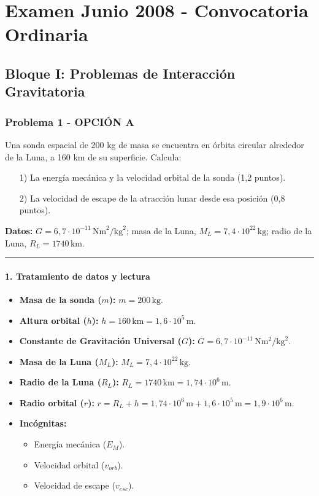 \chapter{Examen Junio 2008 - Convocatoria Ordinaria}
\label{chap:2008_jun_ord}

\section{Bloque I: Problemas de Interacción Gravitatoria}
\label{sec:grav_2008_jun_ord}

\subsection{Problema 1 - OPCIÓN A}
\label{subsec:1A_2008_jun_ord}

\begin{cajaenunciado}
Una sonda espacial de 200 kg de masa se encuentra en órbita circular alrededor de la Luna, a 160 km de su superficie. Calcula:
\begin{enumerate}
    \item[1)] La energía mecánica y la velocidad orbital de la sonda (1,2 puntos).
    \item[2)] La velocidad de escape de la atracción lunar desde esa posición (0,8 puntos).
\end{enumerate}
\textbf{Datos:} $G=6,7\cdot10^{-11}\,\text{Nm}^2/\text{kg}^2$; masa de la Luna, $M_L=7,4\cdot10^{22}\,\text{kg}$; radio de la Luna, $R_L=1740\,\text{km}$.
\end{cajaenunciado}
\hrule

\subsubsection*{1. Tratamiento de datos y lectura}
\begin{itemize}
    \item \textbf{Masa de la sonda ($m$):} $m = 200\,\text{kg}$.
    \item \textbf{Altura orbital ($h$):} $h = 160\,\text{km} = 1,6\cdot10^5\,\text{m}$.
    \item \textbf{Constante de Gravitación Universal ($G$):} $G = 6,7\cdot10^{-11}\,\text{N}\text{m}^2/\text{kg}^2$.
    \item \textbf{Masa de la Luna ($M_L$):} $M_L = 7,4\cdot10^{22}\,\text{kg}$.
    \item \textbf{Radio de la Luna ($R_L$):} $R_L = 1740\,\text{km} = 1,74\cdot10^6\,\text{m}$.
    \item \textbf{Radio orbital ($r$):} $r = R_L + h = 1,74\cdot10^6\,\text{m} + 1,6\cdot10^5\,\text{m} = 1,9\cdot10^6\,\text{m}$.
    \item \textbf{Incógnitas:}
    \begin{itemize}
        \item Energía mecánica ($E_M$).
        \item Velocidad orbital ($v_{orb}$).
        \item Velocidad de escape ($v_{esc}$).
    \end{itemize}
\end{itemize}

